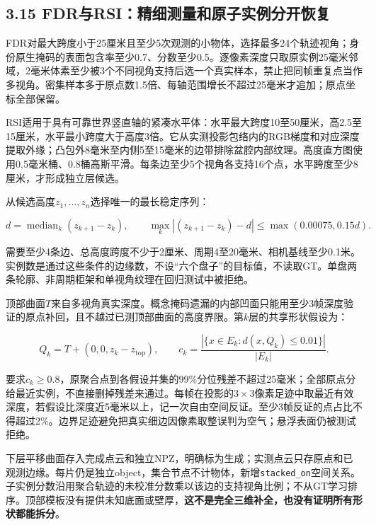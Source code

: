 \documentclass[UTF8,fontset=fandol]{ctexart}
\begin{document}
\subsection*{3.15 FDR与RSI：精细测量和原子实例分开恢复}

FDR对最大跨度小于25厘米且至少5次观测的小物体，选择最多24个轨迹视角；身份原生掩码的表面包含率至少0.7、分数至少0.5。逐像素深度只取原实例25毫米邻域，2毫米体素至少被3个不同视角支持后选一个真实样本，禁止把同帧重复点当作多视角。密集样本多于原点数1.5倍、每轴范围增长不超过25毫米才追加；原点坐标全部保留。



RSI适用于具有可靠世界竖直轴的紧凑水平体：水平最大跨度10至50厘米，高2.5至15厘米，水平最小跨度大于高度3倍。它从实测投影包络内的RGB梯度和对应深度提取外缘；凸包外8毫米至内侧5至15毫米的边带排除盆腔内部纹理。高度直方图使用0.5毫米桶、0.8桶高斯平滑。每条边至少5个视角各支持16个点，水平跨度至少8厘米，才形成独立层候选。



从候选高度$z_1,\ldots,z_n$选择唯一的最长稳定序列：



\[
d=\operatorname{median}_{k}(z_{k+1}-z_k),\qquad
\max_k|(z_{k+1}-z_k)-d|\leq\max(0.00075,0.15d).
\]

需要至少4条边、总高度跨度不少于2厘米、周期4至20毫米、相机基线至少0.1米。实例数是通过这些条件的边缘数，不设“六个盘子”的目标值，不读取GT。单盘两条轮廓、非周期柜架和单视角纹理在回归测试中被拒绝。



顶部曲面$T$来自多视角真实深度。概念掩码遗漏的内部凹面只能用至少3帧深度验证的原点补回，且不越过已测顶部曲面的高度界限。第$k$层的共享形状假设为：



\[
Q_k=T+(0,0,z_k-z_{\mathrm{top}}),\qquad
c_k=\frac{|\{x\in E_k:d(x,Q_k)\leq0.01\}|}{|E_k|}.
\]

要求$c_k\geq0.8$，原聚合点到各假设并集的99\%分位残差不超过25毫米；全部原点分给最近实例，不直接删掉残差来通过。每帧在投影的$3\times3$像素足迹中取最近有效深度，若假设比深度近5毫米以上，记一次自由空间反证。至少3帧反证的点占比不得超过2\%。边界足迹避免把真实细边因像素取整误判为空气；悬浮表面仍被测试拒绝。



下层平移曲面存入完成点云和独立NPZ，明确标为生成；实测点云只存原点和已观测边缘。每片仍是独立object，集合节点不计物体，新增\texttt{stacked\_\allowbreak{}on}空间关系。子实例分数沿用聚合轨迹的未校准分数乘以该边的支持视角比例；不从GT学习排序。顶部模板没有提供未知底面或壁厚，\textbf{这不是完全三维补全，也没有证明所有形状都能拆分}。
\end{document}

